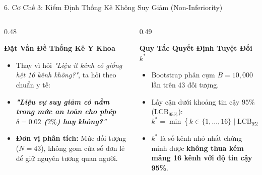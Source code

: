 \documentclass[aspectratio=169,10pt]{beamer}
\begin{document}
\begin{frame}{6. Cơ Chế 3: Kiểm Định Thống Kê Không Suy Giảm (Non-Inferiority)}
    \begin{columns}[T]
        \begin{column}{0.48\textwidth}
            \begin{block}{\textbf{Đặt Vấn Đề Thống Kê Y Khoa}}
                \footnotesize
                \begin{itemize}
                    \item Thay vì hỏi \textit{"Liệu ít kênh có giống hệt 16 kênh không?"}, ta hỏi theo chuẩn y tế:
                    \item \textbf{\textit{"Liệu sự suy giảm có nằm trong mức an toàn cho phép $\delta = 0.02$ ($2\%$) hay không?"}}
                    \item \textbf{Đơn vị phân tích:} Mức đối tượng ($N=43$), không gom cửa sổ đơn lẻ để giữ nguyên tương quan người.
                \end{itemize}
            \end{block}
        \end{column}
        
        \begin{column}{0.49\textwidth}
            \begin{exampleblock}{\textbf{Quy Tắc Quyết Định Tuyệt Đối $k^*$}}
                \footnotesize
                \begin{itemize}
                    \item Bootstrap phân cụm $B = 10{,}000$ lần trên 43 đối tượng.
                    \item Lấy cận dưới khoảng tin cậy $95\%$ ($\text{LCB}_{95\%}$):
                    \[
                        k^* = \min \left\{ k \in \{1,\dots,16\} \mid \text{LCB}_{95\%}(\Delta_k) > -\delta \right\}
                    \]
                    \item $k^*$ là số kênh nhỏ nhất chứng minh được \textbf{không thua kém mảng 16 kênh với độ tin cậy 95\%}.
                \end{itemize}
            \end{exampleblock}
        \end{column}
    \end{columns}
\end{frame}
\end{document}
